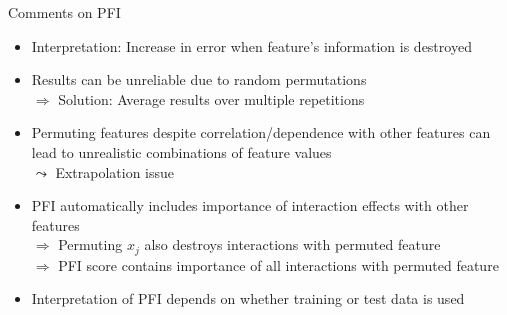 \documentclass[10pt,compress,t,notes=noshow, xcolor=table]{beamer}
\begin{document}
\begin{frame}{Comments on PFI}
 \begin{itemize}[<+->]
 \itemsep1em
  \item Interpretation: Increase in error when feature's information is destroyed
  \item Results can be unreliable due to random permutations \\
  $\Rightarrow$ Solution: Average results over multiple repetitions
  \item Permuting features despite correlation/dependence with other features can lead to unrealistic combinations of feature values 
  \\$\leadsto$ Extrapolation issue %
  \item PFI automatically includes importance of interaction effects with other features \\
  $\Rightarrow$ Permuting $x_j$ also destroys interactions with permuted feature\\
  $\Rightarrow$ PFI score contains importance of all interactions with permuted feature %
  \item Interpretation of PFI depends on whether training or test data is used
 \end{itemize}
\end{frame}
\end{document}
